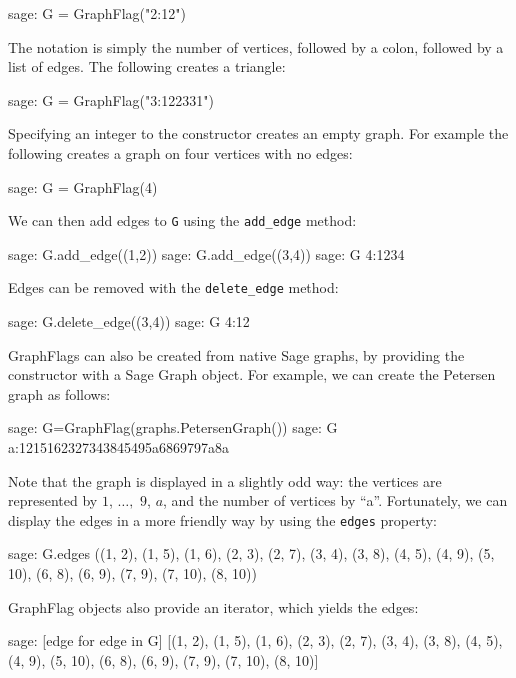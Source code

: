 \documentclass{article}
\begin{document}
\begin{sage}
sage: G = GraphFlag("2:12")
\end{sage}

The notation is simply the number of vertices, followed by a colon, followed by a list of edges. The following creates a triangle:

\begin{sage}
sage: G = GraphFlag("3:122331")
\end{sage}

Specifying an integer to the constructor creates an empty graph. For example the following 
creates a graph on four vertices with no edges:

\begin{sage}
sage: G = GraphFlag(4)
\end{sage}

We can then add edges to \verb|G| using the \verb|add_edge| method:

\begin{sage}
sage: G.add_edge((1,2))
sage: G.add_edge((3,4))
sage: G
4:1234
\end{sage}

Edges can be removed with the \verb|delete_edge| method:

\begin{sage}
sage: G.delete_edge((3,4))
sage: G
4:12
\end{sage}

GraphFlags can also be created from native Sage graphs, by providing the constructor with a Sage Graph object. For example, we can create the Petersen graph as follows:

\begin{sage}
sage: G=GraphFlag(graphs.PetersenGraph())
sage: G
a:1215162327343845495a6869797a8a
\end{sage}

Note that the graph is displayed in a slightly odd way: the vertices are represented by $1$, $\dots,$ $9$, $a$, and the number of vertices by ``a''. Fortunately, we can display the edges in a more friendly way by using the \verb|edges| property:

\begin{sage}
sage: G.edges
((1, 2), (1, 5), (1, 6), (2, 3), (2, 7), (3, 4), (3, 8), (4, 5), (4, 9),
(5, 10), (6, 8), (6, 9), (7, 9), (7, 10), (8, 10))
\end{sage}

GraphFlag objects also provide an iterator, which yields the edges:

\begin{sage}
sage: [edge for edge in G]
[(1, 2), (1, 5), (1, 6), (2, 3), (2, 7), (3, 4), (3, 8), (4, 5), (4, 9),
(5, 10), (6, 8), (6, 9), (7, 9), (7, 10), (8, 10)]
\end{sage}
\end{document}
